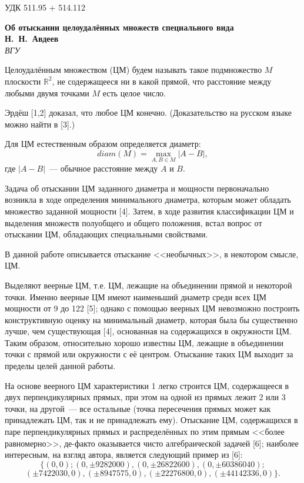 \documentclass[12pt]{article}
\begin{document}
\noindent УДК 511.95 + 514.112

\begin{center}
\textbf{Об отыскании целоудалённых множеств специального вида} \\[3mm]
\textbf{Н.~Н.~Авдеев}\\[2mm]
\emph{ВГУ}
\end{center}

Целоудалённым множеством (ЦМ) будем называть такое подмножество $M$ плоскости $\mathbb{R}^2$,
не содержащееся ни в какой прямой,
что расстояние между любыми двумя точками $M$ есть целое число.

Эрдёш [1,2] доказал, что любое ЦМ конечно.
(Доказательство на русском языке можно найти в [3].)

Для ЦМ естественным образом определяется диаметр:
$$
	diam(M) = \max_{A,B\in M} |A-B|,
$$
где $|A-B|$~--- обычное расстояние между $A$ и $B$.

Задача об отыскании ЦМ заданного диаметра и мощности первоначально возникла
в ходе определения минимального диаметра,
которым может обладать множество заданной мощности [4].
Затем, в ходе развития классификации ЦМ и выделения множеств полуобщего и общего положения,
встал вопрос от отыскании ЦМ, обладающих специальными свойствами.


В данной работе описывается отыскание <<необычных>>, в некотором смысле, ЦМ.

Выделяют веерные ЦМ, т.е. ЦМ, лежащие на объединении прямой и некоторой точки.
Именно веерные ЦМ имеют наименьший диаметр среди всех ЦМ мощности от 9 до 122 [5];
однако с помощью веерных ЦМ невозможно построить конструктивную оценку на минимальный диаметр,
которая была бы существенно лучше, чем существующая [4], основанная на содержащихся в окружности ЦМ.
Таким образом, относительно хорошо известны ЦМ, лежащие в объединении точки с прямой или окружности с её центром.
Отыскание таких ЦМ выходит за пределы целей данной работы.

На основе веерного ЦМ характеристики 1 легко строится ЦМ, содержащееся в двух перпендикулярных прямых,
при этом на одной из прямых лежит 2 или 3 точки, на другой~--- все остальные
(точка пересечения прямых может как принадлежать ЦМ, так и не принадлежать ему).
Отыскание ЦМ, содержащихся в паре перпендикулярных прямых и распределённых по этим прямым
<<более равномерно>>, де-факто оказывается чисто алгебраической задачей [6];
наиболее интересным, на взгляд автора, является следующий пример из [6]:
$$
\{
(0,0);
(0,\pm 9282000),
(0,\pm 26822600),
(0,\pm 60386040);
$$
$$
(\pm 7422030,0),
(\pm 8947575, 0),
(\pm 22276800,0),
(\pm 44142336,0)
\}
.
$$
\end{document}
